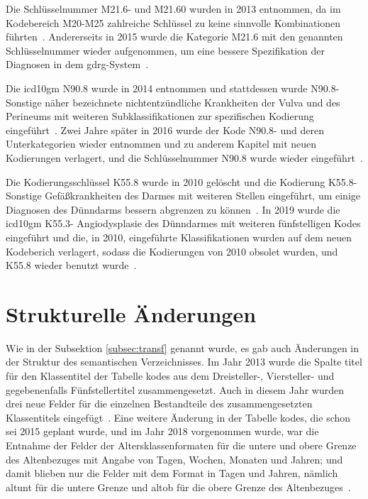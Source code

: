 Die Schlüsselnummer \textsf{M21.6-} und \textsf{M21.60} wurden in 2013 entnommen, da im Kodebereich \textsf{M20-M25} zahlreiche Schlüssel zu keine sinnvolle Kombinationen führten~\cite{dele13}. Andererseits in 2015 wurde die Kategorie \textsf{M21.6} mit den genannten Schlüsselnummer wieder aufgenommen, um eine bessere Spezifikation der Diagnosen in dem \ac{gdrg}-System~\cite{komm15}. 

Die \ac{icd10gm} \textsf{N90.8} wurde in 2014 entnommen und stattdessen wurde \textsf{N90.8-} \textsf{Sonstige näher bezeichnete nichtentzündliche Krankheiten der Vulva und des Perineums} mit weiteren Subklassifikationen zur spezifischen Kodierung eingeführt~\cite{komm14}. Zwei Jahre später in 2016 wurde der Kode \textsf{N90.8-} und deren Unterkategorien wieder entnommen und zu anderem Kapitel mit neuen Kodierungen verlagert, und die Schlüsselnummer \textsf{N90.8} wurde wieder eingeführt~\cite{komm16}.

Die Kodierungsschlüssel \textsf{K55.8} wurde in 2010 gelöscht und die Kodierung \textsf{K55.8-} \textsf{Sonstige Gefäßkrankheiten des Darmes} mit weiteren Stellen eingeführt, um einige Diagnosen des Dünndarms bessern abgrenzen zu können~\cite{komm10}. In 2019 wurde die \ac{icd10gm} \textsf{K55.3-}   \textsf{Angiodysplasie des Dünndarmes} mit weiteren fünfstelligen Kodes eingeführt und die, in 2010, eingeführte Klassifikationen wurden auf dem neuen Kodeberich verlagert, sodass die Kodierungen von 2010 obsolet wurden, und \textsf{K55.8} wieder benutzt wurde~\cite{komm19}.

\section{Strukturelle Änderungen} \label{sec:strucmodif}

Wie in der Subsektion \ref{subsec:transf} genannt wurde, es gab auch Änderungen in der Struktur des semantischen Verzeichnisses. Im Jahr 2013 wurde die Spalte \textsf{titel} für den Klassentitel der Tabelle \textsf{kodes} aus dem Dreisteller-, Viersteller- und gegebenenfalls Fünfstellertitel zusammengesetzt. Auch in diesem Jahr wurden drei neue Felder für die einzelnen Bestandteile des zusammengesetzten Klassentitels eingefügt~\cite{readme13}. Eine weitere Änderung in der Tabelle \textsf{kodes}, die schon sei 2015 geplant wurde, und im Jahr 2018 vorgenommen wurde, war die Entnahme der Felder der Altersklassenformaten für die untere und obere Grenze des Altenbezuges mit Angabe von Tagen, Wochen, Monaten und Jahren; und damit blieben nur die Felder mit dem Format in Tagen und Jahren, nämlich  \textsf{altunt} für die untere Grenze und \textsf{altob} für die obere Grenze des Altenbezuges~\cite{readme17}.
